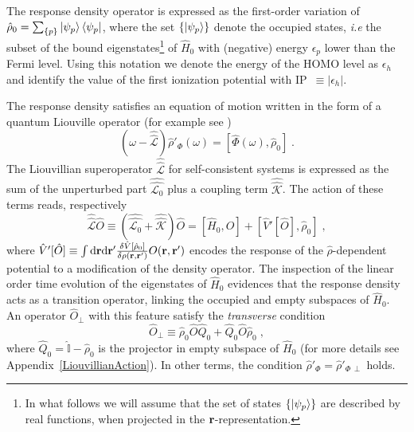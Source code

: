 \documentclass[reprint,aps,prb]{revtex4-1}
\newcommand{\dd}{{\rm d}}
\renewcommand{\r}{{\bf r}}
\newcommand{\eps}{\epsilon}
\newcommand{\be}{\begin{equation}}
\newcommand{\ee}{\end{equation}}
\newcommand{\lb}{\label}
\newcommand{\op}[1]{\hat {#1}}
\newcommand{\sop}[1]{\op{\op {#1}}}
\newcommand{\commutator}[2]{\left[ {#1} , {#2} \right]}
\newcommand{\dmnot}{\op{\rho}_0}
\newcommand{\dm}{\op{\rho}}
\newcommand{\hnot}{\op{H}_0}
\newcommand{\Liouv}{\sop{\mathcal L}}
\newcommand{\Liouvnot}{\sop{\mathcal L_0}}
\newcommand{\coupl}{\sop{\mathcal K}}
\newcommand{\identity}{\op{\mathbb I}}
\begin{document}
The response density operator is expressed as the first-order variation of $\dmnot=\sum_{\{p\}} \ket{\psi_p} \bra{\psi_p}$, where the set $\{\ket{\psi_p}\}$ denote the
occupied states, \emph{i.e} the subset of the bound eigenstates\footnote{In what follows we will assume that the set of states $\{\ket{\psi_p}\}$ are described by real
functions, when projected in the $\r$-representation.} of $\hnot$ with (negative) energy $\eps_p$ lower than the Fermi level. Using this notation we denote the energy of the HOMO level
as $\eps_h$ and identify the value of the first ionization potential with IP~$\equiv|\eps_h|$.

The response density satisfies an equation of motion written in the form of a quantum Liouville operator (for example see \cite{baroni2008})
\be\lb{LiouvillianRhopomegaDef1}
\left(\omega - \Liouv\right) \dm'_\Phi(\omega) =  \commutator{\op\Phi(\omega)}{\dmnot} \;.
\ee
The Liouvillian superoperator $\Liouv$ for self-consistent systems is expressed as the sum of the unperturbed part $\Liouvnot$ plus a coupling term $ \coupl$. The action of these
terms reads, respectively
\be\lb{LiouZeroDef1}
\Liouv \op O \equiv \left(\Liouvnot + \coupl \right) \op O = \commutator{\hnot}{\op O} +\commutator{\op V'[\op O]}{\dmnot}  \;,
\ee
where $\op V'[\op O] \equiv \int \dd \r \dd \r'\frac{\delta \op V[\dmnot]}{\delta \rho(\r,\r')} O(\r,\r')$ encodes the response of the $\dm$-dependent potential to a modification of the density operator.
The inspection of the linear order time evolution of the eigenstates of $\hnot$ evidences that the response density acts as a transition
operator, linking the occupied and empty subspaces of $\hnot$.
An operator $\op O_\perp$ with this feature satisfy the \emph{transverse} condition
\be\lb{RhopTransverseDef1}
\op O_\perp \equiv
\dmnot\op O \op Q_0 + \op Q_0 \op O\dmnot \;,
\ee
where $\op Q_0=\identity-\dmnot$ is the projector in empty subspace of $\hnot$
(for more details see Appendix~\ref{LiouvillianAction}).
In other terms, the condition $\dm'_\Phi = \dm'_{\Phi\,\perp}$ holds.
\end{document}

